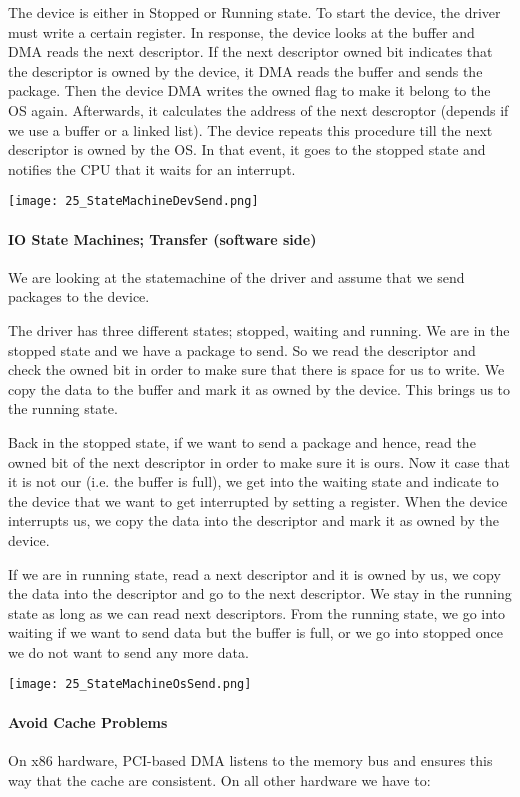 The device is either in Stopped or Running state. To start the device, the driver must write a certain register. In response, the device looks at the buffer and DMA reads the next descriptor. If the next descriptor owned bit indicates that the descriptor is owned by the device, it DMA reads the buffer and sends the package. Then the device DMA writes the owned flag to make it belong to the OS again. Afterwards, it calculates the address of the next descroptor (depends if we use a buffer or a linked list). The device repeats this procedure till the next descriptor is owned by the OS. In that event, it goes to the stopped state and notifies the CPU that it waits for an interrupt.

\texttt{[image: 25\_StateMachineDevSend.png]}

\paragraph{IO State Machines; Transfer (software side)}
We are looking at the statemachine of the driver and assume that we send packages to the device.

The driver has three different states; stopped, waiting and running. We are in the stopped state and we have a package to send. So we read the descriptor and check the owned bit in order to make sure that there is space for us to write. We copy the data to the buffer and mark it as owned by the device. This brings us to the running state.

Back in the stopped state, if we want to send a package and hence, read the owned bit of the next descriptor in order to make sure it is ours. Now it case that it is not our (i.e. the buffer is full), we get into the waiting state and indicate to the device that we want to get interrupted by setting a register. When the device interrupts us, we copy the data into the descriptor and mark it as owned by the device.

If we are in running state, read a next descriptor and it is owned by us, we copy the data into the descriptor and go to the next descriptor. We stay in the running state as long as we can read next descriptors. From the running state, we go into waiting if we want to send data but the buffer is full, or we go into stopped once we do not want to send any more data.

\texttt{[image: 25\_StateMachineOsSend.png]}


\paragraph{Avoid Cache Problems}
On x86 hardware, PCI-based DMA listens to the memory bus and ensures this way that the cache are consistent. On all other hardware we have to:

